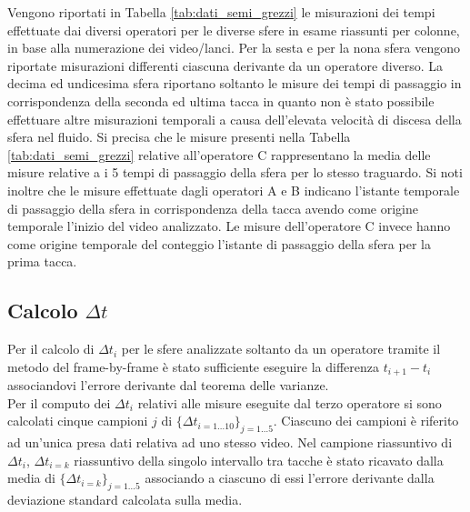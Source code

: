 \documentclass[a4paper,11pt,oneside]{article}
\begin{document}
Vengono riportati in Tabella \ref{tab:dati_semi_grezzi} le misurazioni dei tempi effettuate dai diversi operatori per le diverse sfere in esame riassunti per colonne, in base alla numerazione dei video/lanci.
Per la sesta e per la nona sfera vengono riportate misurazioni differenti ciascuna derivante da un operatore diverso.
La decima ed undicesima sfera riportano soltanto le misure dei tempi di passaggio in corrispondenza della seconda ed ultima tacca in quanto non è stato possibile effettuare altre misurazioni temporali a causa dell'elevata velocità di discesa della sfera nel fluido.
Si precisa che le misure presenti nella Tabella \ref{tab:dati_semi_grezzi} relative all'operatore C rappresentano la media delle misure relative a i 5 tempi di passaggio della sfera per lo stesso traguardo.
Si noti inoltre che le misure effettuate dagli operatori A e B indicano l'istante temporale di passaggio della sfera in corrispondenza della tacca avendo come origine temporale l'inizio del video analizzato. Le misure dell'operatore C invece hanno come origine temporale  del conteggio l'istante di passaggio della sfera per la prima tacca.


\subsection{Calcolo $\Delta t$}
Per il calcolo di $\Delta t_{i}$ per le sfere analizzate soltanto da un operatore tramite il metodo del frame-by-frame è stato sufficiente eseguire la differenza $t_{i+1}- t_{i}$ associandovi l'errore derivante dal teorema delle varianze.\\
\newline
Per il computo dei $\Delta t_{i}$ relativi alle misure eseguite dal terzo operatore si sono calcolati cinque campioni $j$ di $\{\Delta t_{i=1\dots10}\}_{j=1\dots5}$. Ciascuno dei campioni è riferito ad un'unica presa dati relativa ad uno stesso video.
Nel campione riassuntivo di ${\Delta t_{i}}$, $\Delta t_{i=k}$ riassuntivo della singolo intervallo tra tacche è stato ricavato dalla media di $\{\Delta t_{i=k}\}_{j=1\dots5}$ associando a ciascuno di essi l'errore derivante dalla deviazione standard calcolata sulla media.


\end{document}
